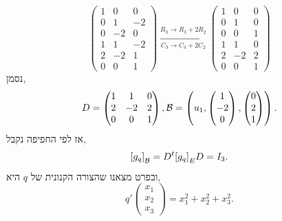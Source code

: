 \begin{solution}
\[		\begin{pmatrix}
			1 & 0 & 0 \\
			0 & 1 & -2 \\
			0 & -2 & 0 \\
			\hline
			1 & 1 & -2 \\
			2 & -2 & 1 \\
			0 & 0 & 1
		\end{pmatrix}
		\xrightarrow[C_3 \to C_3 + 2 C_2]{R_3 \to R_3 + 2 R_2}
		\begin{pmatrix}
			1 & 0 & 0 \\
			0 & 1 & 0 \\
			0 & 0 & 1 \\
			\hline
			1 & 1 & 0 \\
			2 & -2 & 2 \\
			0 & 0 & 1
		\end{pmatrix}
	\]
	נסמן,
	\[
		D
		= \begin{pmatrix}
			1 & 1 & 0 \\
			2 & -2 & 2 \\
			0 & 0 & 1
		\end{pmatrix},
		\mathcal{B}
		= \left( u_1,
		\begin{pmatrix} 1 \\ -2 \\ 0 \end{pmatrix},
		\begin{pmatrix} 0 \\ 2 \\ 1 \end{pmatrix} \right)
	.\]
	אז לפי החפיפה נקבל,
	\[
		{[g_q]}_{\mathcal{B}}
		= D^t {[g_q]}_E D
		= I_3
	.\]
	ובפרט מצאנו שהצורה הקנונית של $q$ היא,
	\[
		q' \begin{pmatrix} x_1 \\ x_2 \\ x_3 \end{pmatrix}
		= x_1^2 + x_2^2 + x_3^2
	.\]
\end{solution}

